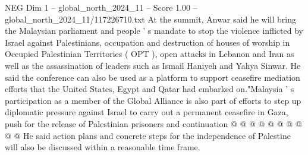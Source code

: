 \begin{textsample}{NEG Dim 1 – global\_north\_2024\_11 – Score 1.00 – global\_north\_2024\_11/117226710.txt}
At the summit, Anwar said he will bring the Malaysian parliament and people ' s mandate to stop the violence inflicted by Israel against Palestinians, occupation and destruction of houses of worship in Occupied Palestinian Territories ( OPT ), open attacks in Lebanon and Iran as well as the assassination of leaders such as Ismail Haniyeh and Yahya Sinwar.
He said the conference can also be used as a platform to support ceasefire mediation efforts that the United States, Egypt and Qatar had embarked on."Malaysia ' s participation as a member of the Global Alliance is also part of efforts to step up diplomatic pressure against Israel to carry out a permanent ceasefire in Gaza, push for the release of Palestinian prisoners and continuation @ @ @ @ @ @ @ @ @ @ He said action plans and concrete steps for the independence of Palestine will also be discussed within a reasonable time frame.

\end{textsample}

